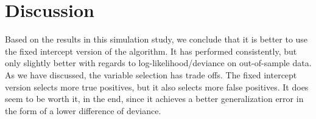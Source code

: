 \section{Discussion}
Based on the results in this simulation study, we conclude that it is better to use the fixed intercept version of the algorithm.
It has performed consistently, but only slightly better with regards to log-likelihood/deviance on out-of-sample data.
As we have discussed, the variable selection has trade offs.
The fixed intercept version selects more true positives, but it also selects more false positives.
It does seem to be worth it, in the end, since it achieves a better generalization error in the form of a lower difference of deviance.

